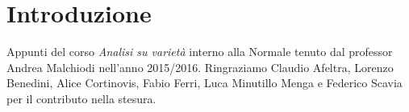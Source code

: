 \chapter{Introduzione}

Appunti del corso \emph{Analisi su varietà} interno alla Normale tenuto dal professor Andrea Malchiodi nell'anno 2015/2016.
Ringraziamo Claudio Afeltra, Lorenzo Benedini, Alice Cortinovis, Fabio Ferri, Luca Minutillo Menga e Federico Scavia per il contributo nella stesura.